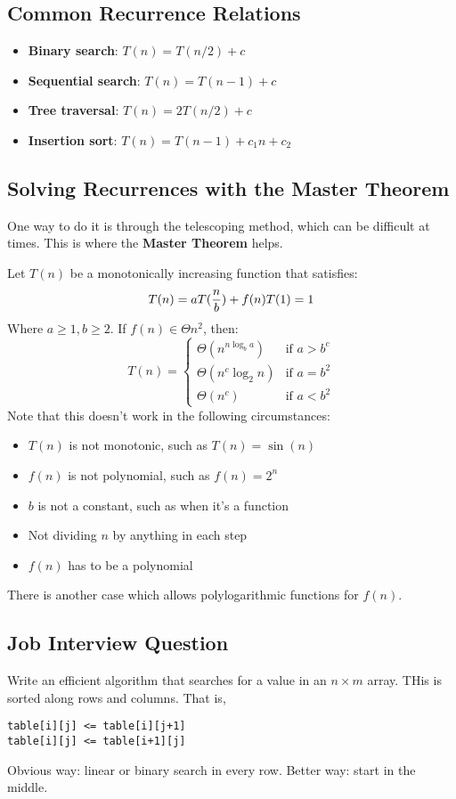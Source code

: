 \subsection{Common Recurrence Relations}
\begin{itemize}
	\item \textbf{Binary search}: $T(n)=T(n/2)+c$
	\item \textbf{Sequential search}: $T(n)=T(n-1)+c$
	\item \textbf{Tree traversal}: $T(n)=2T(n/2)+c$
	\item \textbf{Insertion sort}: $T(n)=T(n-1)+c_1 n + c_2$
\end{itemize}

\subsection{Solving Recurrences with the Master Theorem}
One way to do it is through the telescoping method, which can be difficult at times. This is where the \textbf{Master Theorem} helps.

Let $T(n)$ be a monotonically increasing function that satisfies:
$$T(n)=aT(\frac{n}{b})+f(n)\\T(1)=1$$
Where $a\geq 1, b\geq 2$. If $f(n)\in\Theta{n^2}$, then:
$$T(n)=\begin{cases}
	\Theta{(n^{n\log_b a})} &\text{if } a>b^c\\
	\Theta{(n^c \log_2 n)} &\text{if } a=b^2\\
	\Theta{(n^c)} &\text{if } a<b^2
\end{cases}$$
Note that this doesn't work in the following circumstances:
\begin{itemize}
	\item $T(n)$ is not monotonic, such as $T(n)=\sin (n)$
	\item $f(n)$ is not polynomial, such as $f(n)=2^n$
	\item $b$ is not a constant, such as when it's a function
	\item Not dividing $n$ by anything in each step
	\item $f(n)$ has to be a polynomial
\end{itemize}
There is another case which allows polylogarithmic functions for $f(n)$.

\subsection{Job Interview Question}
Write an efficient algorithm that searches for a value in an $n\times m$ array. THis is sorted along rows and columns. That is,
\begin{lstlisting}[style=C++]
table[i][j] <= table[i][j+1]
table[i][j] <= table[i+1][j]
\end{lstlisting}
Obvious way: linear or binary search in every row. Better way: start in the middle.

